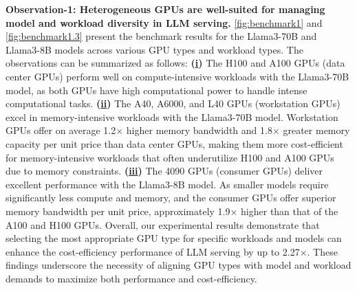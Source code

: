 \textbf{Observation-1: Heterogeneous GPUs are well-suited for managing model and workload diversity in LLM serving.} \autoref{fig:benchmark1} 
and \autoref{fig:benchmark1.3} 
present the benchmark results for the Llama3-70B and Llama3-8B models across various GPU types and workload types. The observations can be summarized as follows: 
\textbf{(\underline{i})} The H100 and A100 GPUs (data center GPUs) perform well on compute-intensive workloads with the Llama3-70B model, as both GPUs have high computational power to handle intense computational tasks. 
\textbf{(\underline{ii})} The A40, A6000, and L40 GPUs (workstation GPUs) excel in memory-intensive workloads with the Llama3-70B model. 
Workstation GPUs offer on average 1.2$\times$ higher
memory bandwidth and 1.8$\times$ greater memory capacity per unit price than data center GPUs, making them more cost-efficient for memory-intensive workloads that often underutilize H100 and A100 GPUs due to memory constraints.
\textbf{(\underline{iii})} The 4090 GPUs (consumer GPUs) deliver excellent performance with the Llama3-8B model. As smaller models require significantly less compute and memory, and the consumer GPUs offer superior memory bandwidth per unit price, approximately 1.9$\times$ higher than that of the A100 and H100 GPUs. 
Overall, our experimental results demonstrate that selecting the most appropriate GPU type for specific workloads and models can enhance the cost-efficiency performance of LLM serving by up to 2.27$\times$. 
These findings underscore the necessity of aligning GPU types with model and workload demands to maximize both performance and cost-efficiency. 



